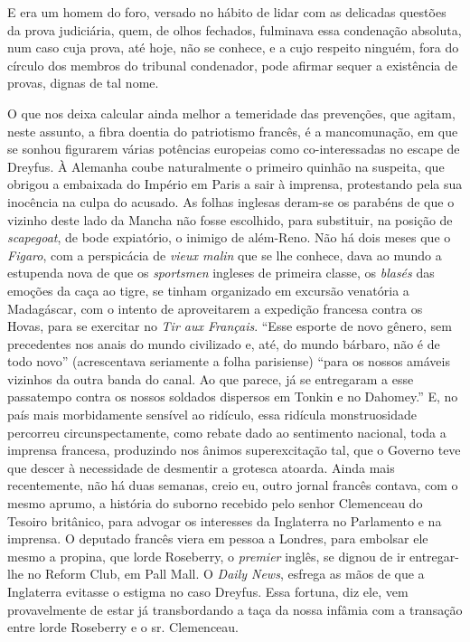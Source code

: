 E era um homem do foro, versado no hábito de lidar com as delicadas
questões da prova judiciária, quem, de olhos fechados, fulminava essa
condenação absoluta, num caso cuja prova, até hoje, não se conhece, e a
cujo respeito ninguém, fora do círculo dos membros do tribunal
condenador, pode afirmar sequer a existência de provas, dignas de tal nome.

O que nos deixa calcular ainda melhor a temeridade das prevenções, que
agitam, neste assunto, a fibra doentia do patriotismo francês, é a
mancomunação, em que se sonhou figurarem várias potências europeias
como co-interessadas no escape de Dreyfus. À Alemanha coube
naturalmente o primeiro quinhão na suspeita, que obrigou a embaixada do
Império em Paris a sair à imprensa, protestando pela sua inocência na
culpa do acusado. As folhas inglesas deram-se os parabéns de que o
vizinho deste lado da Mancha não fosse escolhido, para substituir, na
posição de \textit{scapegoat}, de bode expiatório, o inimigo de além-Reno. Não
há dois meses que o \textit{Figaro}, com a perspicácia de \textit{vieux malin} que se lhe
conhece, dava ao mundo a estupenda nova de que os \textit{sportsmen} ingleses de
primeira classe, os \textit{blasés} das emoções da caça ao tigre, se tinham
organizado em excursão venatória a Madagáscar, com o intento de
aproveitarem a expedição francesa contra os Hovas, para se exercitar no
\textit{Tir aux Français}. ``Esse esporte de novo gênero, sem
precedentes nos anais do mundo civilizado e, até, do mundo bárbaro, não
é de todo novo'' (acrescentava seriamente a folha
parisiense) ``para os nossos amáveis vizinhos da outra
banda do canal. Ao que parece, já se entregaram a esse passatempo
contra os nossos soldados dispersos em Tonkin e no
Dahomey.'' E, no país mais morbidamente sensível ao
ridículo, essa ridícula monstruosidade percorreu circunspectamente,
como rebate dado ao sentimento nacional, toda a imprensa francesa,
produzindo nos ânimos superexcitação tal, que o Governo teve que descer
à necessidade de desmentir a grotesca atoarda. Ainda mais recentemente,
não há duas semanas, creio eu, outro jornal francês contava, com o
mesmo aprumo, a história do suborno recebido pelo senhor Clemenceau do
Tesoiro britânico, para advogar os interesses da Inglaterra no
Parlamento e na imprensa. O deputado francês viera em pessoa a Londres,
para embolsar ele mesmo a propina, que lorde Roseberry, o \textit{premier}
inglês, se dignou de ir entregar-lhe no Reform Club, em Pall Mall. O
\textit{Daily News}, esfrega as mãos de que a Inglaterra evitasse o estigma no
caso Dreyfus. Essa fortuna, diz ele, vem provavelmente de estar já
transbordando a taça da nossa infâmia com a transação entre lorde
Roseberry e o sr. Clemenceau.

